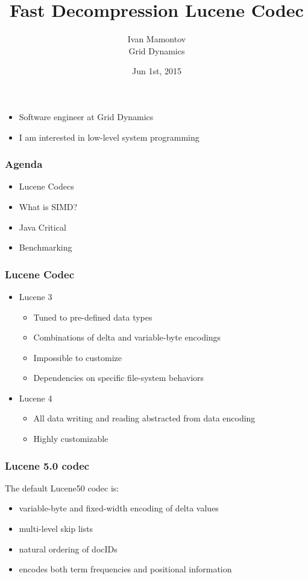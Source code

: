 \documentclass{beamer}
\title{Fast Decompression Lucene Codec}
\author{Ivan Mamontov\\ Grid Dynamics}
\institute{Berlin Buzzwords}
\date{Jun 1st, 2015}
\begin{document}
	\begin{frame}
		\titlepage
	\end{frame}
	\begin{frame}
    		\begin{itemize}
    			\frametitle{About me}
    		    \item Software engineer at Grid Dynamics
    		    \item I am interested in low-level system programming
		\end{itemize}
  	\end{frame}
  	\begin{frame}
  		\frametitle{Agenda}
  			\begin{itemize}
  			\item Lucene Codecs
  			\item What is SIMD?
  			\item Java Critical
  			\item Benchmarking
  			\end{itemize}
  	\end{frame}
  	\begin{frame}
  		\frametitle{Lucene Codec}
  		\begin{itemize}
  			\item Lucene 3
  			\begin{itemize}
  				\item Tuned to pre-defined data types
  				\item Combinations of delta and variable-byte encodings
  				\item Impossible to customize
  				\item Dependencies on specific file-system behaviors
  			\end{itemize}
	  			\item Lucene 4
  					\begin{itemize}
  						\item All data writing and reading abstracted from data encoding
  						\item Highly customizable
  					\end{itemize}		
  		\end{itemize}
  	\end{frame}
  	\begin{frame}
  		\frametitle{Lucene 5.0 codec}
  		The default Lucene50 codec is:
  		\begin{itemize}
  			\item variable-byte and fixed-width encoding of delta values
  			\item multi-level skip lists
  			\item natural ordering of docIDs
  			\item encodes both term frequencies and positional information
  		\end{itemize}
  	\end{frame}
\end{document}
